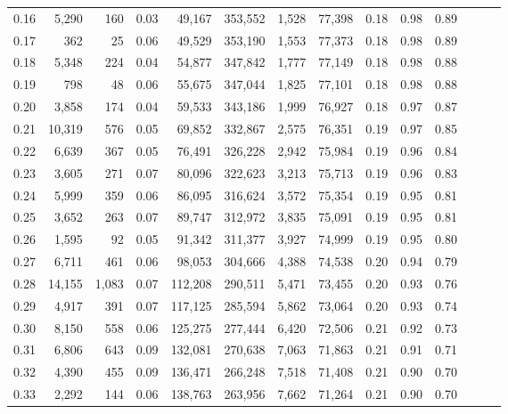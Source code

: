 \begin{tabular}{rrrrrrrrrrrrrr}
0.16 &   5,290 &    160 &  0.03 &   49,167 &  353,552 &   1,528 &  77,398 &  0.18 &  0.98 &      0.89 \\
0.17 &     362 &     25 &  0.06 &   49,529 &  353,190 &   1,553 &  77,373 &  0.18 &  0.98 &      0.89 \\
0.18 &   5,348 &    224 &  0.04 &   54,877 &  347,842 &   1,777 &  77,149 &  0.18 &  0.98 &      0.88 \\
0.19 &     798 &     48 &  0.06 &   55,675 &  347,044 &   1,825 &  77,101 &  0.18 &  0.98 &      0.88 \\
0.20 &   3,858 &    174 &  0.04 &   59,533 &  343,186 &   1,999 &  76,927 &  0.18 &  0.97 &      0.87 \\
0.21 &  10,319 &    576 &  0.05 &   69,852 &  332,867 &   2,575 &  76,351 &  0.19 &  0.97 &      0.85 \\
0.22 &   6,639 &    367 &  0.05 &   76,491 &  326,228 &   2,942 &  75,984 &  0.19 &  0.96 &      0.84 \\
0.23 &   3,605 &    271 &  0.07 &   80,096 &  322,623 &   3,213 &  75,713 &  0.19 &  0.96 &      0.83 \\
0.24 &   5,999 &    359 &  0.06 &   86,095 &  316,624 &   3,572 &  75,354 &  0.19 &  0.95 &      0.81 \\
0.25 &   3,652 &    263 &  0.07 &   89,747 &  312,972 &   3,835 &  75,091 &  0.19 &  0.95 &      0.81 \\
0.26 &   1,595 &     92 &  0.05 &   91,342 &  311,377 &   3,927 &  74,999 &  0.19 &  0.95 &      0.80 \\
0.27 &   6,711 &    461 &  0.06 &   98,053 &  304,666 &   4,388 &  74,538 &  0.20 &  0.94 &      0.79 \\
0.28 &  14,155 &  1,083 &  0.07 &  112,208 &  290,511 &   5,471 &  73,455 &  0.20 &  0.93 &      0.76 \\
0.29 &   4,917 &    391 &  0.07 &  117,125 &  285,594 &   5,862 &  73,064 &  0.20 &  0.93 &      0.74 \\
0.30 &   8,150 &    558 &  0.06 &  125,275 &  277,444 &   6,420 &  72,506 &  0.21 &  0.92 &      0.73 \\
0.31 &   6,806 &    643 &  0.09 &  132,081 &  270,638 &   7,063 &  71,863 &  0.21 &  0.91 &      0.71 \\
0.32 &   4,390 &    455 &  0.09 &  136,471 &  266,248 &   7,518 &  71,408 &  0.21 &  0.90 &      0.70 \\
0.33 &   2,292 &    144 &  0.06 &  138,763 &  263,956 &   7,662 &  71,264 &  0.21 &  0.90 &      0.70 \\

\end{tabular}
